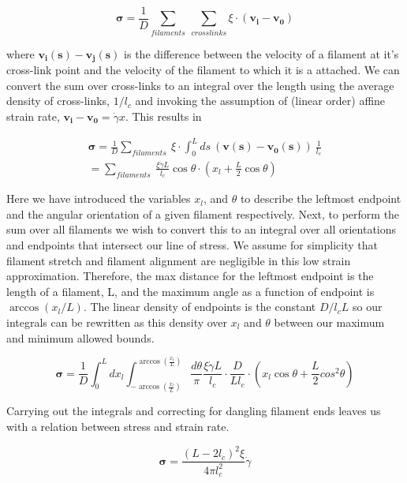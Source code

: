 \documentclass[pre,reprint]{revtex4-1}
\begin{document}
\begin{equation}
\mathbf{\sigma} = \frac{1}{D}\sum_{filaments}\: \sum_{crosslinks}\xi \cdot (\mathbf{v_i}-\mathbf{v_0})
\end{equation}

where $\mathbf{v_i(s)}-\mathbf{v_j(s)}$ is the difference between the velocity of a filament at it's cross-link point and the velocity of the filament to which it is a attached. We can convert the sum over cross-links to an integral over the length using the average density of cross-links, $1/l_c$ and invoking the assumption of (linear order) affine strain rate, $\mathbf{v_i}-\mathbf{v_0}=\dot \gamma x$. This results in

\begin{multline}
\mathbf{\sigma} =  \frac{1}{D}\sum_{filaments}\:  \xi \cdot \int_0^L ds \: (\mathbf{v(s)}-\mathbf{v_0(s)}) \:\frac{1}{l_c} \\
 = \sum_{filaments}\:  \frac{\xi \dot \gamma L}{l_c} \cos \theta \cdot (x_l + \frac{L}{2} \cos \theta)
\end{multline}

Here we have introduced the variables $x_l$, and $\theta$ to describe the leftmost endpoint and the angular orientation of a given filament respectively.  Next, to perform the sum over all filaments we wish to convert this to an integral over all orientations and endpoints that intersect our line of stress. We assume for simplicity that filament stretch and filament alignment are negligible in this low strain approximation.  Therefore, the max distance for the leftmost endpoint is the length of a filament, L, and the maximum angle as a function of endpoint is $\arccos(x_l/L)$.  The linear density of endpoints is the constant $D/l_cL$ so our integrals can be rewritten as this density over $x_l$ and $\theta$ between our maximum and minimum allowed bounds.

\begin{equation}
\mathbf{\sigma} =  \frac{1}{D} \int_0^L dx_l \int_{-\arccos (\frac{x_l}{L})}^{\arccos (\frac{x_l}{L})}\frac{d\theta}{\pi} \frac{\xi \dot \gamma L}{l_c} \cdot \frac{D}{Ll_c}\cdot (x_l \cos \theta + \frac{L}{2} cos^2\theta)
\end{equation}

Carrying out the integrals and correcting for dangling filament ends leaves us with a relation between stress and strain rate.

\begin{equation}
\mathbf{\sigma} = \frac{(L-2l_c)^2 \xi}{4\pi l_c^2} \dot \gamma 
\end{equation}
\end{document}
